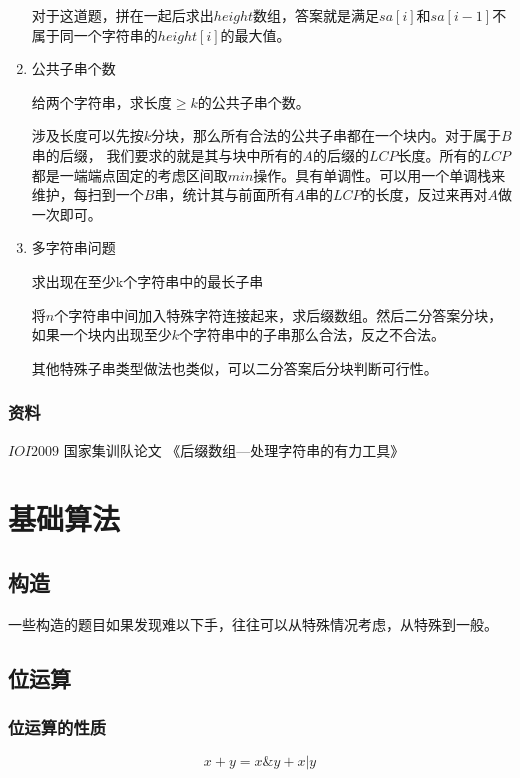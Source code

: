 \documentclass[11pt]{article}
\begin{document}
\begin{enumerate}
对于这道题，拼在一起后求出\(height\)数组，答案就是满足\(sa[i]\)和\(sa[i-1]\)不属于同一个字符串的\(height[i]\)的最大值。

\item 公共子串个数
\label{sec:org7ebe9fd}

给两个字符串，求长度\(\geq k\)的公共子串个数。

涉及长度可以先按\(k\)分块，那么所有合法的公共子串都在一个块内。对于属于\(B\)串的后缀， 我们要求的就是其与块中所有的\(A\)的后缀的\(LCP\)长度。所有的\(LCP\)都是一端端点固定的考虑区间取\(min\)操作。具有单调性。可以用一个单调栈来维护，每扫到一个\(B\)串，统计其与前面所有\(A\)串的\(LCP\)的长度，反过来再对\(A\)做一次即可。

\item 多字符串问题
\label{sec:org5c3e0e7}

求出现在至少k个字符串中的最长子串

将\(n\)个字符串中间加入特殊字符连接起来，求后缀数组。然后二分答案分块，如果一个块内出现至少\(k\)个字符串中的子串那么合法，反之不合法。

其他特殊子串类型做法也类似，可以二分答案后分块判断可行性。
\end{enumerate}

\subsubsection{资料}
\label{sec:orgab6327a}

\(IOI2009\) 国家集训队论文 《后缀数组—处理字符串的有力工具》
\section{基础算法}
\label{sec:org5a19b91}
\subsection{构造}
\label{sec:org0528b34}

一些构造的题目如果发现难以下手，往往可以从特殊情况考虑，从特殊到一般。

\subsection{位运算}
\label{sec:org204a74d}
\subsubsection{位运算的性质}
\label{sec:orgdca81d4}

\[
x+y=x \& y + x | y
\]
\end{document}
